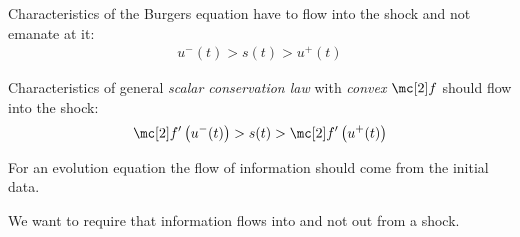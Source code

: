 \begin{propositionbox}\nospacing
    \begin{proposition}\label{proposition:lax_oleinik_entropy_condition_burger}
        Characteristics of the Burgers equation have to flow into the shock and not emanate at it:
        \begin{align}
          u^{-}(t)>s(t)>u^{+}(t)
        \end{align}
    \end{proposition}
\end{propositionbox}
\begin{propositionbox}\nospacing
    \begin{proposition}\label{proposition:lax_oleinik_entropy_condition}
        Characteristics of general \textit{scalar conservation law} with \textit{convex} $\flux$ should flow into the shock:
        \begin{align}
          \flux'\left(u^{-}(t)\right)>s(t)>\flux'\left(u^{+}(t)\right)\label{eq:lax_entropy_oleinik_condtion_convex}
        \end{align}
    \end{proposition}
\end{propositionbox}
\begin{explanationbox}\nospacing
    \begin{explanation}\leavevmode
        \begin{itemizenosep}
            \item For an evolution equation the flow of information should come from the initial data.
            \item We want to require that information flows into and not out from a shock.
        \end{itemizenosep}
    \end{explanation}
\end{explanationbox}

